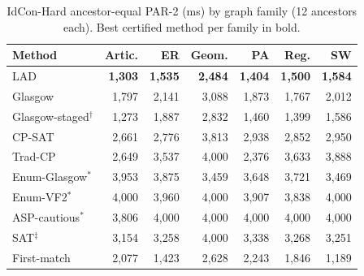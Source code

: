 \begin{table}[t]
\caption{IdCon-Hard ancestor-equal PAR-2 (ms) by graph family (12 ancestors each). Best certified method per family in bold.}
\label{tab:family}
\centering\footnotesize
\setlength{\tabcolsep}{3pt}
\begin{tabular}{lrrrrrr}
\toprule
Method & Artic. & ER & Geom. & PA & Reg. & SW\\
\midrule
LAD & \textbf{1,303} & \textbf{1,535} & \textbf{2,484} & \textbf{1,404} & \textbf{1,500} & \textbf{1,584}\\
Glasgow & 1,797 & 2,141 & 3,088 & 1,873 & 1,767 & 2,012\\
Glasgow-staged$^\dagger$ & 1,273 & 1,887 & 2,832 & 1,460 & 1,399 & 1,586\\
CP-SAT & 2,661 & 2,776 & 3,813 & 2,938 & 2,852 & 2,950\\
Trad-CP & 2,649 & 3,537 & 4,000 & 2,376 & 3,633 & 3,888\\
Enum-Glasgow$^\ast$ & 3,953 & 3,875 & 3,459 & 3,648 & 3,721 & 3,469\\
Enum-VF2$^\ast$ & 4,000 & 3,960 & 4,000 & 3,907 & 3,838 & 4,000\\
ASP-cautious$^\ast$ & 3,806 & 4,000 & 4,000 & 4,000 & 4,000 & 4,000\\
SAT$^\ddagger$ & 3,154 & 3,258 & 4,000 & 3,338 & 3,268 & 3,251\\
\midrule
First-match & 2,077 & 1,423 & 2,628 & 2,243 & 1,846 & 1,189\\
\bottomrule
\end{tabular}
\end{table}
